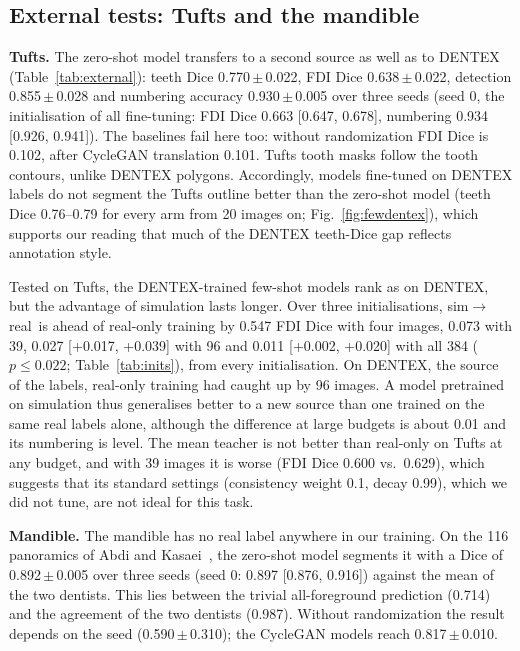 \documentclass[preprint,12pt]{elsarticle}
\newcommand{\sr}{sim$\to$real}
\newcommand{\pmsd}[2]{#1\,$\pm$\,#2}
\begin{document}
\subsection{External tests: Tufts and the mandible}
\textbf{Tufts.} The zero-shot model transfers to a second source as well as to DENTEX (Table~\ref{tab:external}):
teeth Dice \pmsd{0.770}{0.022}, FDI Dice \pmsd{0.638}{0.022}, detection \pmsd{0.855}{0.028} and numbering accuracy
\pmsd{0.930}{0.005} over three seeds (seed 0, the initialisation of all fine-tuning: FDI Dice 0.663 [0.647, 0.678], numbering 0.934 [0.926, 0.941]). The
baselines fail here too: without randomization FDI Dice is 0.102, after CycleGAN translation 0.101. Tufts tooth masks
follow the tooth contours, unlike DENTEX polygons. Accordingly, models fine-tuned on DENTEX labels do not segment the
Tufts outline better than the zero-shot model (teeth Dice 0.76--0.79 for every arm from 20 images on;
Fig.~\ref{fig:fewdentex}),
which supports our reading that much of the DENTEX teeth-Dice gap reflects annotation style.

Tested on Tufts, the DENTEX-trained few-shot models rank as on DENTEX, but the advantage of simulation lasts longer.
Over three initialisations, \sr\ is ahead of real-only training by 0.547 FDI Dice with four images, 0.073 with 39, 0.027
[+0.017, +0.039] with 96 and 0.011 [+0.002, +0.020] with all 384 ($p \leq 0.022$; Table~\ref{tab:inits}), from every
initialisation. On DENTEX, the source of the labels, real-only training had caught up by 96 images. A model pretrained
on simulation thus generalises better to a new source than one trained on the same real labels alone, although the
difference at large budgets is about 0.01 and its numbering is level. The mean teacher is not better than real-only on
Tufts at any budget, and with 39 images it is worse (FDI Dice 0.600 vs.\ 0.629), which suggests that its standard
settings (consistency weight 0.1, decay 0.99), which we did not tune, are not ideal for this task.

\textbf{Mandible.} The mandible has no real label anywhere in our training. On the 116 panoramics of Abdi and
Kasaei~\cite{abdi2015}, the zero-shot model segments it with a Dice of \pmsd{0.892}{0.005} over three seeds (seed 0:
0.897 [0.876, 0.916]) against the mean of the two dentists. This lies between the trivial all-foreground prediction
(0.714) and the agreement of the two dentists (0.987). Without randomization the result depends on the seed
(\pmsd{0.590}{0.310}); the CycleGAN models reach \pmsd{0.817}{0.010}.
\end{document}
